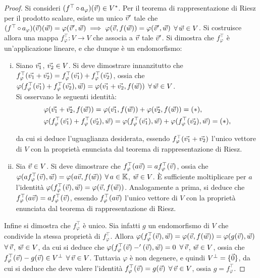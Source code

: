 \begin{proof}
	Si consideri $(f^\top \circ a_\varphi)(\v) \in V^*$. Per il teorema di rappresentazione di Riesz per
	il prodotto scalare, esiste un unico $\v'$ tale che $(f^\top \circ a_\varphi)(\v)(\w) = \varphi(\v', \w) \implies \varphi(\v, f(\w)) = \varphi(\v', \w)$ $\forall \w \in V$. Si costruisce allora una mappa
	$f_\varphi^\top : V \to V$ che associa a $\v$ tale $\v'$. Si dimostra che $f_\varphi^\top$ è un'applicazione lineare, e che
	dunque è un endomorfismo:
	
	\begin{enumerate}[(i)]
		\item Siano $\vv 1$, $\vv 2 \in V$. Si deve dimostrare innanzitutto che $f_\varphi^\top(\vv 1 + \vv 2) = f_\varphi^\top(\vv 1) + f_\varphi^\top(\vv 2)$, ossia che $\varphi(f_\varphi^\top(\vv 1) + f_\varphi^\top(\vv 2), \w) = \varphi(\vv 1 + \vv 2, f(\w))$ $\forall \w \in V$. \\
		
		Si osservano le seguenti identità:			
		\begin{align*}
			&\varphi(\vv 1 + \vv 2, f(\w)) = \varphi(\vv 1, f(\w)) + \varphi(\vv 2, f(\w)) = (*), \\
			&\varphi(f_\varphi^\top(\vv 1) + f_\varphi^\top(\vv 2), \w) = \varphi(f_\varphi^\top(\vv 1), \w) + \varphi(f_\varphi^\top(\vv 2), \w) = (*),
		\end{align*}
		
		da cui si deduce l'uguaglianza desiderata, essendo $f_\varphi^\top(\vv 1 + \vv 2)$ l'unico vettore di $V$
		con la proprietà enunciata dal teorema di rappresentazione di Riesz.
		
		\item Sia $\v \in V$. Si deve dimostrare che $f_\varphi^\top(a \v) = a f_\varphi^\top(\v)$, ossia che $\varphi(a f_\varphi^\top(\v), \w) =
		\varphi(a\v, f(\w))$ $\forall a \in \KK$, $\w \in V$. È
		sufficiente moltiplicare per $a$ l'identità $\varphi(f_\varphi^\top(\v), \w) = \varphi(\v, f(\w))$. Analogamente
		a prima, si deduce che $f_\varphi^\top(a \v) = a f_\varphi^\top(\v)$, essendo $f_\varphi^\top(a \v)$ l'unico vettore di $V$ con la
		proprietà enunciata dal teorema di rappresentazione di Riesz.
	\end{enumerate}
	
	Infine si dimostra che $f_\varphi^\top$ è unico. Sia infatti $g$ un endomorfismo di $V$ che condivide la stessa
	proprietà di $f_\varphi^\top$. Allora $\varphi(f_\varphi^\top(\v), \w) = \varphi(\v, f(\w)) = \varphi(g(\v), \w)$ $\forall \v$, $\w \in V$, da cui si deduce che $\varphi(f_\varphi^\top(\v) - '(\v), \w) = 0$ $\forall \v$, $\w \in V$, ossia che
	$f_\varphi^\top(\v) - g(\v) \in V^\perp$ $\forall \v \in V$. Tuttavia $\varphi$ è non degenere, e quindi $V^\perp = \zerovecset$, da cui si deduce che deve valere l'identità $f_\varphi^\top(\v) = g(\v)$ $\forall \v \in V$, ossia
	$g = f_\varphi^\top$.
\end{proof}

